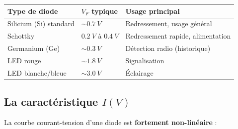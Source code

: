 \documentclass[12pt,a4paper,twoside]{book}
\begin{document}
\begin{center}
\begin{tabular}{lll}
\toprule
\textbf{Type de diode} & \textbf{$V_F$ typique} & \textbf{Usage principal} \\
\midrule
Silicium (Si) standard & $\sim\SI{0.7}{V}$ & Redressement, usage général \\
Schottky & $\SI{0.2}{V}$ à $\SI{0.4}{V}$ & Redressement rapide, alimentation \\
Germanium (Ge) & $\sim\SI{0.3}{V}$ & Détection radio (historique) \\
LED rouge & $\sim\SI{1.8}{V}$ & Signalisation \\
LED blanche/bleue & $\sim\SI{3.0}{V}$ & Éclairage \\
\bottomrule
\end{tabular}
\end{center}

\subsection{La caractéristique $I(V)$}

La courbe courant-tension d'une diode est \textbf{fortement non-linéaire} :
\end{document}
